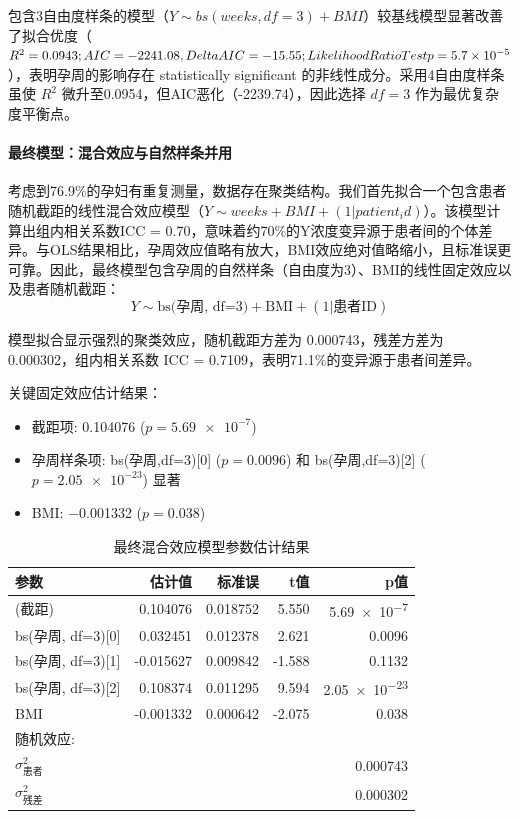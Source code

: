 \documentclass[withoutpreface]{cumcmthesis}
\begin{document}
包含3自由度样条的模型（$Y \sim bs(weeks, df=3) + BMI$）较基线模型显著改善了拟合优度（$R^2 = 0.0943; AIC = -2241.08, \\Delta AIC = -15.55; Likelihood Ratio Test\\ p = 5.7\times 10^{-5}$），表明孕周的影响存在 statistically significant 的非线性成分。采用4自由度样条虽使 $R^2$ 微升至0.0954，但AIC恶化（-2239.74），因此选择 $df=3$ 作为最优复杂度平衡点。

\paragraph{最终模型：混合效应与自然样条并用}
考虑到76.9\%的孕妇有重复测量，数据存在聚类结构。我们首先拟合一个包含患者随机截距的线性混合效应模型（$Y \sim weeks + BMI + (1|patient_id)$）。该模型计算出组内相关系数ICC = 0.70，意味着约70\%的Y浓度变异源于患者间的个体差异。与OLS结果相比，孕周效应值略有放大，BMI效应绝对值略缩小，且标准误更可靠。因此，最终模型包含孕周的自然样条（自由度为3）、BMI的线性固定效应以及患者随机截距：
\begin{equation*}
Y \sim \text{bs(孕周, df=3)} + \text{BMI} + (1|\text{患者ID})
\end{equation*}

模型拟合显示强烈的聚类效应，随机截距方差为 \num{0.000743}，残差方差为 \num{0.000302}，组内相关系数 ICC = \num{0.7109}，表明71.1\%的变异源于患者间差异。

关键固定效应估计结果：
\begin{itemize}
  \item 截距项: \num{0.104076} ($p = \num{5.69e-7}$)
  \item 孕周样条项: bs(孕周,df=3)[0] ($p = \num{0.0096}$) 和 bs(孕周,df=3)[2] ($p = \num{2.05e-23}$) 显著
  \item BMI: \num{-0.001332} ($p = \num{0.038}$)
\end{itemize}

\begin{table}[htbp]
  \centering
  \caption{最终混合效应模型参数估计结果}
  \label{tab:params}
  \begin{tabular}{@{}lrrrr@{}}
    \toprule
    参数 & 估计值 & 标准误 & t值 & p值 \\
    \midrule
    (截距) & 0.104076 & 0.018752 & 5.550 & \num{5.69e-7} \\
    bs(孕周, df=3)[0] & 0.032451 & 0.012378 & 2.621 & 0.0096 \\
    bs(孕周, df=3)[1] & -0.015627 & 0.009842 & -1.588 & 0.1132 \\
    bs(孕周, df=3)[2] & 0.108374 & 0.011295 & 9.594 & \num{2.05e-23} \\
    BMI & -0.001332 & 0.000642 & -2.075 & 0.038 \\
    \midrule
    \multicolumn{5}{l}{随机效应:}\\
    $\sigma^2_{\text{患者}}$ & \multicolumn{4}{r}{0.000743}\\
    $\sigma^2_{\text{残差}}$ & \multicolumn{4}{r}{0.000302}\\
    \bottomrule
  \end{tabular}
\end{table}
\end{document}
